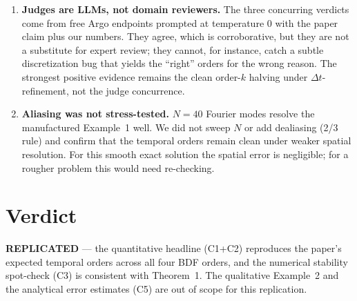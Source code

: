 \documentclass[11pt]{article}
\begin{document}
\begin{enumerate}[leftmargin=1.6em]
  \item \textbf{Judges are LLMs, not domain reviewers.} The three
        concurring verdicts come from free Argo endpoints prompted at
        temperature 0 with the paper claim plus our numbers. They agree,
        which is corroborative, but they are not a substitute for expert
        review; they cannot, for instance, catch a subtle discretization
        bug that yields the ``right'' orders for the wrong reason. The
        strongest positive evidence remains the clean order-$k$ halving
        under $\Delta t$-refinement, not the judge concurrence.

  \item \textbf{Aliasing was not stress-tested.} $N=40$ Fourier modes
        resolve the manufactured Example~1 well. We did not sweep $N$ or
        add dealiasing (2/3 rule) and confirm that the temporal orders
        remain clean under weaker spatial resolution. For this smooth
        exact solution the spatial error is negligible; for a rougher
        problem this would need re-checking.
\end{enumerate}

\section{Verdict}
\textbf{REPLICATED} --- the quantitative headline (C1+C2) reproduces the
paper's expected temporal orders across all four BDF orders, and the
numerical stability spot-check (C3) is consistent with Theorem~1. The
qualitative Example~2 and the analytical error estimates (C5) are out of
scope for this replication.
\end{document}
